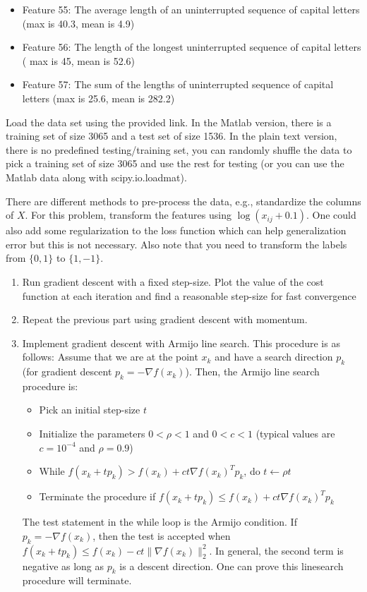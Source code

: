 \begin{enumerate}
\begin{itemize}
     \item Feature 55: The average length of an uninterrupted sequence of capital letters (max is 40.3, mean is 4.9)
     \item Feature 56: The length of the longest uninterrupted sequence of capital letters ( max is 45, mean is 52.6)
     \item Feature 57: The sum of the lengths of uninterrupted sequence of capital letters (max is 25.6, mean is 282.2)
     \end{itemize}
     Load the data set using the provided link. In the Matlab version, there is a training set of size 3065 and a test set of size 1536. In the plain text version, there is no predefined testing/training set, you can randomly shuffle the data to pick a training set of size 3065 and use the rest for testing (or you can use the Matlab data along with scipy.io.loadmat).
     
     There are different methods to pre-process the data, e.g., standardize the columns of $X$. For this problem, transform the features using $\log(x_{ij}+0.1)$. One could also add some regularization to the loss function which can help generalization error but this is not necessary. Also note that you need to transform the labels from $\{0, 1\}$ to $\{1, -1 \}$.
 \begin{enumerate}
     \item Run gradient descent with a fixed step-size. Plot the value of the cost function at each iteration and find a reasonable step-size for fast convergence
     \item Repeat the previous part using gradient descent with momentum.
     \item Implement gradient descent with Armijo line search. This procedure is as follows: Assume that we are at the point $x_k$ and have a search direction $p_k$ (for gradient descent $p_k=-\nabla f(x_k)$). Then, the Armijo line search procedure is: 
     \begin{itemize}
         \item Pick an initial step-size $t$
         \item Initialize the parameters $0<\rho<1$ and $0<c<1$ (typical values are $c=10^{-4}$ and $\rho=0.9$)
         \item While $f(x_k+t p_k)>f(x_k)+ct \nabla f(x_k)^T p_k$, do $t \leftarrow \rho t$
         \item Terminate the procedure if $f(x_k+t p_k)\leq f(x_k)+ct \nabla f(x_k)^T p_k$
     \end{itemize}
     The test statement in the while loop is the Armijo condition. If $p_k=-\nabla f(x_k)$, then the test is accepted when $f(x_k+t p_k) \leq f(x_k)-ct \|\nabla f(x_k)\|_2^2$. In general, the second term is negative as long as $p_k$ is a descent direction. One can prove this linesearch procedure will terminate.
     

\end{enumerate}
\end{enumerate}
